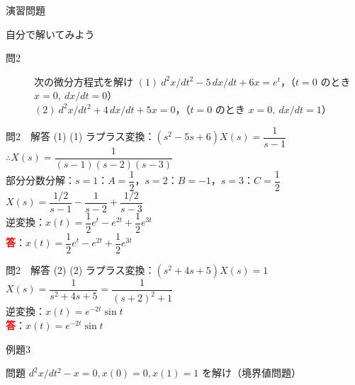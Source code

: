 \documentclass[professionalfonts]{beamer}
\begin{document}
\begin{frame}{演習問題}
  \begin{exampleblock}{自分で解いてみよう}
  \begin{description}
    \item[問2] 次の微分方程式を解け
    $(1)\ d^{2}x/dt^{2} - 5\,dx/dt + 6x = e^{t}$，（$t=0$ のとき $x=0,\ dx/dt=0$）\\
    $(2)\ d^{2}x/dt^{2} + 4\,dx/dt + 5x = 0$，（$t=0$ のとき $x=0,\ dx/dt=1$）\\
  \end{description}
  \end{exampleblock}
\end{frame}

\begin{frame}{問2　解答 (1)}
  (1) ラプラス変換：$(s^{2}-5s+6)X(s) = \dfrac{1}{s-1}$ \quad $\therefore X(s) = \dfrac{1}{(s-1)(s-2)(s-3)}$\\[4pt]
  部分分数分解：$s=1$：$A=\dfrac{1}{2}$，\quad $s=2$：$B=-1$，\quad $s=3$：$C=\dfrac{1}{2}$\\[4pt]
  $X(s) = \dfrac{1/2}{s-1} - \dfrac{1}{s-2} + \dfrac{1/2}{s-3}$\\[4pt]
  逆変換：$x(t) = \dfrac{1}{2}e^{t} - e^{2t} + \dfrac{1}{2}e^{3t}$
  \\[8pt]\textcolor{red}{\textbf{答}}：$x(t) = \dfrac{1}{2}e^{t} - e^{2t} + \dfrac{1}{2}e^{3t}$
\end{frame}

\begin{frame}{問2　解答 (2)}
  (2) ラプラス変換：$(s^{2}+4s+5)X(s) = 1$\\[4pt]
  $X(s) = \dfrac{1}{s^{2}+4s+5} = \dfrac{1}{(s+2)^{2}+1}$\\[4pt]
  逆変換：$x(t) = e^{-2t}\sin t$
  \\[8pt]\textcolor{red}{\textbf{答}}：$x(t) = e^{-2t}\sin t$
\end{frame}

\begin{frame}{例題3}
  \begin{exampleblock}{問題}
    $d^{2}x/dt^{2} - x = 0, x(0) = 0, x(1) = 1$ を解け（境界値問題）\\[2pt]
  \end{exampleblock}
\end{frame}
\end{document}
